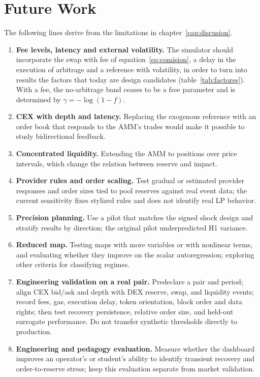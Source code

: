 \chapter{Future Work}
\label{cap:futuro}

The following lines derive from the limitations in chapter~\ref{cap:discusion}.

\begin{enumerate}
  \item \textbf{Fee levels, latency and external volatility.} The simulator should incorporate the swap with fee of equation~\eqref{eq:comision}, a delay in the execution of arbitrage and a reference with volatility, in order to turn into results the factors that today are design candidates (table~\ref{tab:factores}). With a fee, the no-arbitrage band ceases to be a free parameter and is determined by $\gamma=-\log(1-f)$.
  \item \textbf{CEX with depth and latency.} Replacing the exogenous reference with an order book that responds to the AMM's trades would make it possible to study bidirectional feedback.
  \item \textbf{Concentrated liquidity.} Extending the AMM to positions over price intervals, which change the relation between reserve and impact.
  \item \textbf{Provider rules and order scaling.} Test gradual or estimated provider responses and order sizes tied to pool reserves against real event data; the current sensitivity fixes stylized rules and does not identify real LP behavior.
  \item \textbf{Precision planning.} Use a pilot that matches the signed shock design and stratify results by direction; the original pilot underpredicted H1 variance.
  \item \textbf{Reduced map.} Testing maps with more variables or with nonlinear terms, and evaluating whether they improve on the scalar autoregression; exploring other criteria for classifying regimes.
  \item \textbf{Engineering validation on a real pair.} Predeclare a pair and period; align CEX bid/ask and depth with DEX reserve, swap, and liquidity events; record fees, gas, execution delay, token orientation, block order and data rights; then test recovery persistence, relative order size, and held-out surrogate performance. Do not transfer synthetic thresholds directly to production.
  \item \textbf{Engineering and pedagogy evaluation.} Measure whether the dashboard improves an operator's or student's ability to identify transient recovery and order-to-reserve stress; keep this evaluation separate from market validation.
\end{enumerate}
